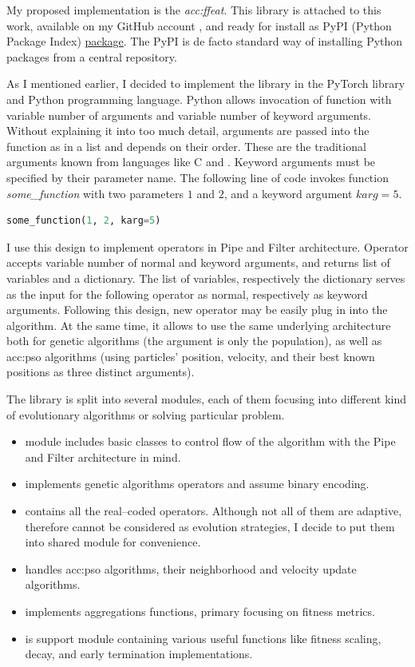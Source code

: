 My proposed implementation is the \emph{\acrfull{acc:ffeat}}. This library is attached to this work, available on my GitHub account \citep{FFEATrepo}, and ready for install as PyPI (Python Package Index) \href{https://pypi.org/project/FFEAT/}{package}. The PyPI is de facto standard way of installing Python packages from a central repository.

As I mentioned earlier, I decided to implement the library in the PyTorch library and Python programming language. Python allows invocation of function with variable number of arguments and variable number of keyword arguments. Without explaining it into too much detail, arguments are passed into the function as in a list and depends on their order. These are the traditional arguments known from languages like C and \cppns. Keyword arguments must be specified by their parameter name. The following line of code invokes function \textit{some\_function} with two parameters $1$ and $2$, and a keyword argument $karg=5$.

\begin{lstlisting}[language=Python]
some_function(1, 2, karg=5)
\end{lstlisting}

I use this design to implement operators in Pipe and Filter architecture. Operator accepts variable number of normal and keyword arguments, and returns list of variables and a dictionary. The list of variables, respectively the dictionary serves as the input for the following operator as normal, respectively as keyword arguments. Following this design, new operator may be easily plug in into the algorithm. At the same time, it allows to use the same underlying architecture both for genetic algorithms (the argument is only the population), as well as \acrshort{acc:pso} algorithms (using particles' position, velocity, and their best known positions as three distinct arguments).

The library is split into several modules, each of them focusing into different kind of evolutionary algorithms or solving particular problem.
\begin{itemize}
    \item {} module includes basic classes to control flow of the algorithm with the Pipe and Filter architecture in mind.
    \item {} implements genetic algorithms operators and assume binary encoding.
    \item {} contains all the real--coded operators. Although not all of them are adaptive, therefore cannot be considered as evolution strategies, I decide to put them into shared module for convenience.
    \item {} handles \acrlong{acc:pso} algorithms, their neighborhood and velocity update algorithms.
    \item {} implements aggregations functions, primary focusing on fitness metrics.
    \item {} is support module containing various useful functions like fitness scaling, decay, and early termination implementations.
\end{itemize}

